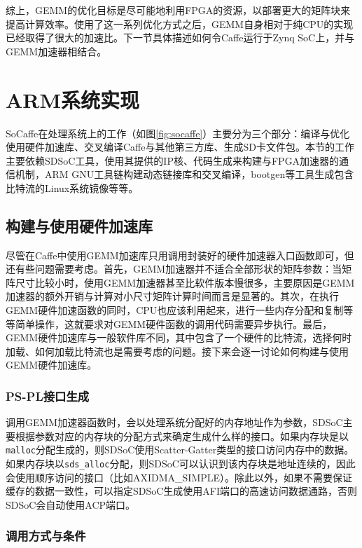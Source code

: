 综上，GEMM的优化目标是尽可能地利用FPGA的资源，以部署更大的矩阵块来提高计算效率。使用了这一系列优化方式之后，GEMM自身相对于纯CPU的实现已经取得了很大的加速比。下一节具体描述如何令Caffe运行于Zynq SoC上，并与GEMM加速器相结合。

\section{ARM系统实现}

SoCaffe在处理系统上的工作（如图\ref{fig:socaffe}）主要分为三个部分：编译与优化使用硬件加速库、交叉编译Caffe与其他第三方库、生成SD卡文件包。本节的工作主要依赖SDSoC工具，使用其提供的IP核、代码生成来构建与FPGA加速器的通信机制，ARM GNU工具链构建动态链接库和交叉编译，bootgen等工具生成包含比特流的Linux系统镜像等等。

\subsection{构建与使用硬件加速库}

尽管在Caffe中使用GEMM加速库只用调用封装好的硬件加速器入口函数即可，但还有些问题需要考虑。首先，GEMM加速器并不适合全部形状的矩阵参数：当矩阵尺寸比较小时，使用GEMM加速器甚至比软件版本慢很多，主要原因是GEMM加速器的额外开销与计算对小尺寸矩阵计算时间而言是显著的。其次，在执行GEMM硬件加速函数的同时，CPU也应该利用起来，进行一些内存分配和复制等等简单操作，这就要求对GEMM硬件函数的调用代码需要异步执行。最后，GEMM硬件加速库与一般软件库不同，其中包含了一个硬件的比特流，选择何时加载、如何加载比特流也是需要考虑的问题。接下来会逐一讨论如何构建与使用GEMM硬件加速库。

\subsubsection{PS-PL接口生成}
调用GEMM加速器函数时，会以处理系统分配好的内存地址作为参数，SDSoC主要根据参数对应的内存块的分配方式来确定生成什么样的接口。如果内存块是以\texttt{malloc}分配生成的，则SDSoC使用Scatter-Gatter类型的接口访问内存中的数据。如果内存块以\texttt{sds\_alloc}分配，则SDSoC可以认识到该内存块是地址连续的，因此会使用顺序访问的接口（比如AXIDMA\_SIMPLE）。除此以外，如果不需要保证缓存的数据一致性，可以指定SDSoC生成使用AFI端口的高速访问数据通路，否则SDSoC会自动使用ACP端口。

\subsubsection{调用方式与条件}

